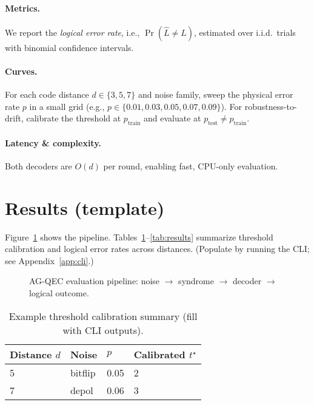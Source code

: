 \documentclass[11pt]{article}
\begin{document}
\paragraph{Metrics.} We report the \emph{logical error rate}, i.e., $\Pr(\hat L \ne L)$, estimated over i.i.d.\ trials with binomial confidence intervals.

\paragraph{Curves.} For each code distance $d\in\{3,5,7\}$ and noise family, sweep the physical error rate $p$ in a small grid (e.g., $p\in\{0.01,0.03,0.05,0.07,0.09\}$). For robustness-to-drift, calibrate the threshold at $p_{\text{train}}$ and evaluate at $p_{\text{test}}\ne p_{\text{train}}$.

\paragraph{Latency \& complexity.} Both decoders are $O(d)$ per round, enabling fast, CPU-only evaluation.

\section{Results (template)}
Figure~\ref{fig:pipeline} shows the pipeline. Tables~\ref{tab:thresholds}--\ref{tab:results} summarize threshold calibration and logical error rates across distances. (Populate by running the CLI; see Appendix~\ref{app:cli}.)

\begin{figure}[H]
  \centering
  \fbox{\rule{0pt}{0.30\linewidth}\rule{0.95\linewidth}{0pt}}
  \caption{AG-QEC evaluation pipeline: noise $\to$ syndrome $\to$ decoder $\to$ logical outcome.}
  \label{fig:pipeline}
\end{figure}

\begin{table}[H]
  \centering
  \caption{Example threshold calibration summary (fill with CLI outputs).}
  \begin{tabular}{llll}
  \toprule
  Distance $d$ & Noise & $p$ & Calibrated $t^\star$ \\
  \midrule
  5 & bitflip & 0.05 & 2 \\
  7 & depol   & 0.06 & 3 \\
  \bottomrule
  \end{tabular}
  \label{tab:thresholds}
\end{table}
\end{document}
